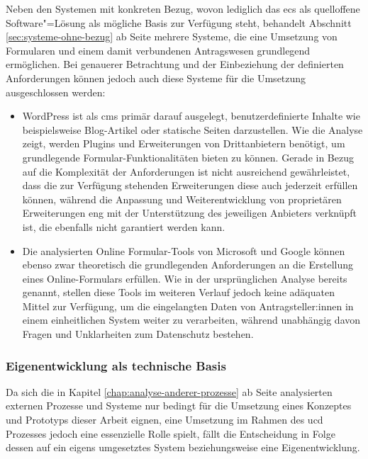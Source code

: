 \documentclass[a4paper,12pt,twoside]{scrreprt}
\begin{document}
Neben den Systemen mit konkreten Bezug, wovon lediglich das \ac{ecs} als quelloffene Software"=Lösung als mögliche Basis zur Verfügung steht, behandelt Abschnitt \ref{sec:systeme-ohne-bezug} ab Seite \pageref{sec:systeme-ohne-bezug} mehrere Systeme, die eine Umsetzung von Formularen und einem damit verbundenen Antragswesen grundlegend ermöglichen. Bei genauerer Betrachtung und der Einbeziehung der definierten Anforderungen können jedoch auch diese Systeme für die Umsetzung ausgeschlossen werden:
\begin{itemize}
    \item WordPress ist als \ac{cms} primär darauf ausgelegt, benutzerdefinierte Inhalte wie beispielsweise Blog-Artikel oder statische Seiten darzustellen. Wie die Analyse zeigt, werden Plugins und Erweiterungen von Drittanbietern benötigt, um grundlegende Formular-Funktionalitäten bieten zu können. Gerade in Bezug auf die Komplexität der Anforderungen ist nicht ausreichend gewährleistet, dass die zur Verfügung stehenden Erweiterungen diese auch jederzeit erfüllen können, während die Anpassung und Weiterentwicklung von proprietären Erweiterungen eng mit der Unterstützung des jeweiligen Anbieters verknüpft ist, die ebenfalls nicht garantiert werden kann.
    \item Die analysierten Online Formular-Tools von Microsoft und Google können ebenso zwar theoretisch die grundlegenden Anforderungen an die Erstellung eines Online-Formulars erfüllen. Wie in der ursprünglichen Analyse bereits genannt, stellen diese Tools im weiteren Verlauf jedoch keine adäquaten Mittel zur Verfügung, um die eingelangten Daten von Antragsteller:innen in einem einheitlichen System weiter zu verarbeiten, während unabhängig davon Fragen und Unklarheiten zum Datenschutz bestehen.
\end{itemize}

\subsubsection*{Eigenentwicklung als technische Basis}
\label{sub-sub-sec:technische-basis-eigenentwicklung}

Da sich die in Kapitel \ref{chap:analyse-anderer-prozesse} ab Seite \pageref{chap:analyse-anderer-prozesse} analysierten externen Prozesse und Systeme nur bedingt für die Umsetzung eines Konzeptes und Prototyps dieser Arbeit eignen, eine Umsetzung im Rahmen des \acl{ucd} Prozesses jedoch eine essenzielle Rolle spielt, fällt die Entscheidung in Folge dessen auf ein eigens umgesetztes System beziehungsweise eine Eigenentwicklung.
\end{document}
